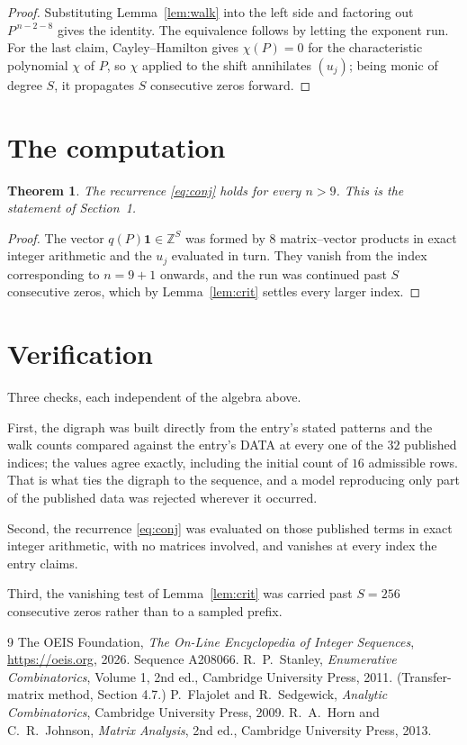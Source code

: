 \documentclass[11pt,a4paper]{article}
\theoremstyle{plain}
\newtheorem{theorem}{Theorem}
\theoremstyle{definition}
\begin{document}
\begin{proof}
Substituting Lemma~\ref{lem:walk} into the left side and factoring out
$P^{\,n-2-8}$ gives the identity. The equivalence follows by letting the exponent
run. For the last claim, Cayley--Hamilton gives $\chi(P)=0$ for the characteristic
polynomial $\chi$ of $P$, so $\chi$ applied to the shift annihilates $(u_j)$; being monic of
degree $S$, it propagates $S$ consecutive zeros forward.
\end{proof}

\section{The computation}

\begin{theorem}
The recurrence \eqref{eq:conj} holds for every $n>9$. This is the statement of
Section~1.
\end{theorem}

\begin{proof}
The vector $q(P)\mathbf{1}\in\mathbb{Z}^{S}$ was formed by $8$ matrix--vector
products in exact integer arithmetic and the $u_j$ evaluated in turn. They vanish from the
index corresponding to $n=9+1$ onwards, and the run was continued past $S$ consecutive
zeros, which by Lemma~\ref{lem:crit} settles every larger index.
\end{proof}

\section{Verification}

Three checks, each independent of the algebra above.

First, the digraph was built directly from the entry's stated patterns and the walk counts
compared against the entry's DATA at every one of the $32$ published indices; the
values agree exactly, including the initial count of $16$ admissible rows. That is
what ties the digraph to the sequence, and a model reproducing only part of the published
data was rejected wherever it occurred.

Second, the recurrence \eqref{eq:conj} was evaluated on those published terms in exact
integer arithmetic, with no matrices involved, and vanishes at every index the entry claims.

Third, the vanishing test of Lemma~\ref{lem:crit} was carried past $S=256$ consecutive
zeros rather than to a sampled prefix.

\begin{thebibliography}{9}
 The OEIS Foundation, \emph{The On-Line Encyclopedia of Integer
Sequences}, \url{https://oeis.org}, 2026. Sequence A208066.
 R.~P.~Stanley, \emph{Enumerative Combinatorics}, Volume 1, 2nd ed.,
Cambridge University Press, 2011. (Transfer-matrix method, Section 4.7.)
 P.~Flajolet and R.~Sedgewick, \emph{Analytic Combinatorics}, Cambridge
University Press, 2009.
 R.~A.~Horn and C.~R.~Johnson, \emph{Matrix Analysis}, 2nd ed., Cambridge
University Press, 2013.
\end{thebibliography}
\end{document}

